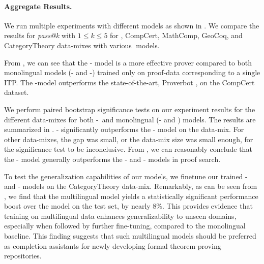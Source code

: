 \paragraph{Aggregate Results.}
We run multiple experiments with different models as shown in . We compare the results for \emph{pass@k} \cite{chen2021evaluating} with $1 \leq k \leq 5$ for \lean, CompCert, MathComp, GeoCoq, and CategoryTheory data-mixes with various \proofwala$\;$models. 

From , we can see that the \proofwala-\multi\; model is a more effective prover compared to both monolingual models (\proofwala-\coq\; and \proofwala-\lean) trained only on proof-data corresponding to a single ITP. The \proofwala-\multi\;model outperforms the state-of-the-art, Proverbot \citep{sanchez2020generating}, on the CompCert dataset. 


We perform paired bootstrap significance tests on our experiment results for the different data-mixes for both \proofwala-\multi\, and monolingual (\proofwala-\coq\; and \lean) models. The results are summarized in .
\proofwala-\multi{} significantly outperforms the \proofwala-\lean{} model on the \lean{} data-mix. For other data-mixes, the gap was small, or the data-mix size was small enough, for the significance test to be inconclusive. From , we can reasonably conclude that the \proofwala-\multi{} model generally outperforms the \proofwala-\coq{} and \proofwala-\lean{} models in proof search.

To test the generalization capabilities of our models, we finetune our trained  \proofwala-\multi{} and \proofwala-\coq{} models on the CategoryTheory data-mix. Remarkably, as can be seen from , we find that the multilingual model yields a statistically significant performance boost over the \coq{} model on the test set, by nearly $8\%$. This provides evidence that training on multilingual data enhances generalizability to unseen domains, especially when followed by further fine-tuning, compared to the monolingual baseline. This finding suggests that such multilingual models should be preferred as completion assistants for newly developing formal theorem-proving repositories.

